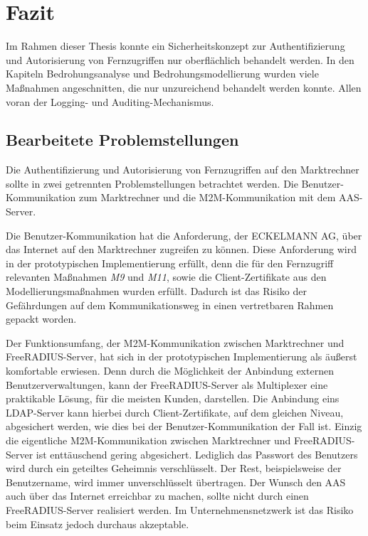 \documentclass[11pt,a4paper]{report}
\begin{document}
\chapter{Fazit}

Im Rahmen dieser Thesis konnte ein Sicherheitskonzept zur Authentifizierung und Autorisierung von Fernzugriffen nur oberflächlich behandelt werden. In den Kapiteln Bedrohungsanalyse und Bedrohungsmodellierung wurden viele Maßnahmen angeschnitten, die nur unzureichend behandelt werden konnte. Allen voran der Logging- und Auditing-Mechanismus.

\section{Bearbeitete Problemstellungen}

Die Authentifizierung und Autorisierung von Fernzugriffen auf den Marktrechner sollte in zwei getrennten Problemstellungen betrachtet werden. Die Benutzer-Kommunikation zum Marktrechner und die M2M-Kommunikation mit dem AAS-Server. 

Die Benutzer-Kommunikation hat die Anforderung, der ECKELMANN AG, über das Internet auf den Marktrechner zugreifen zu können. Diese Anforderung wird in der prototypischen Implementierung erfüllt, denn die für den Fernzugriff relevanten Maßnahmen \textit{M9} und \textit{M11}, sowie die Client-Zertifikate aus den Modellierungsmaßnahmen wurden erfüllt. Dadurch ist das Risiko der Gefährdungen auf dem Kommunikationsweg in einen vertretbaren Rahmen gepackt worden.

Der Funktionsumfang, der M2M-Kommunikation zwischen Marktrechner und FreeRADIUS-Server, hat sich in der prototypischen Implementierung als äußerst komfortable erwiesen. Denn durch die Möglichkeit der Anbindung externen Benutzerverwaltungen, kann der FreeRADIUS-Server als Multiplexer eine praktikable Lösung, für die meisten Kunden, darstellen. Die Anbindung eins LDAP-Server kann hierbei durch Client-Zertifikate, auf dem gleichen Niveau, abgesichert werden, wie dies bei der Benutzer-Kommunikation der Fall ist. Einzig die eigentliche M2M-Kommunikation zwischen Marktrechner und FreeRADIUS-Server ist enttäuschend gering abgesichert. Lediglich das Passwort des Benutzers wird durch ein geteiltes Geheimnis verschlüsselt. Der Rest, beispielsweise der Benutzername, wird immer unverschlüsselt übertragen. Der Wunsch den AAS auch über das Internet erreichbar zu machen, sollte nicht durch einen FreeRADIUS-Server realisiert werden. Im Unternehmensnetzwerk ist das Risiko beim Einsatz jedoch durchaus akzeptable.
\end{document}
